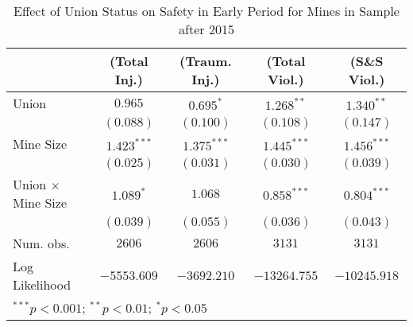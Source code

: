 
\begin{table}[H]
\begin{center}
\begin{tabular}{l c c c c}
\hline
 & (Total Inj.) & (Traum. Inj.) & (Total Viol.) & (S\&S Viol.) \\
\hline
Union                      & $0.965$       & $0.695^{*}$   & $1.268^{**}$  & $1.340^{**}$  \\
                           & $(0.088)$     & $(0.100)$     & $(0.108)$     & $(0.147)$     \\
Mine Size                  & $1.423^{***}$ & $1.375^{***}$ & $1.445^{***}$ & $1.456^{***}$ \\
                           & $(0.025)$     & $(0.031)$     & $(0.030)$     & $(0.039)$     \\
Union $ \times $ Mine Size & $1.089^{*}$   & $1.068$       & $0.858^{***}$ & $0.804^{***}$ \\
                           & $(0.039)$     & $(0.055)$     & $(0.036)$     & $(0.043)$     \\
\hline
Num. obs.                  & $2606$        & $2606$        & $3131$        & $3131$        \\
Log Likelihood             & $-5553.609$   & $-3692.210$   & $-13264.755$  & $-10245.918$  \\
\hline
\multicolumn{5}{l}{\scriptsize{$^{***}p<0.001$; $^{**}p<0.01$; $^{*}p<0.05$}}
\end{tabular}
\caption{Effect of Union Status on Safety in Early Period for Mines in Sample after 2015}
\label{irr_100employees_activelate}
\end{center}
\end{table}

